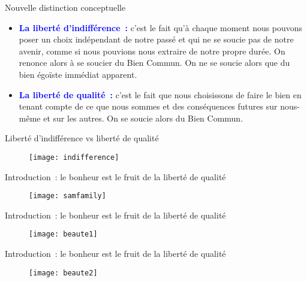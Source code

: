 \documentclass[11pt,xcolor=dvipsname,ignorenonframetext,handout]{beamer}
\begin{document}
\begin{frame}{Nouvelle distinction conceptuelle}
    \begin{itemize}
        \rightskip=0pt\leftskip=0pt
        \item \textcolor{blue}{\textbf{La liberté d'indifférence~:}} c'est le fait qu'à chaque moment nous pouvons poser un choix indépendant de notre passé et qui ne se soucie pas de notre avenir, comme si nous pouvions nous extraire de notre propre durée. On renonce alors à se soucier du Bien Commun. On ne se soucie alors que du bien égoïste immédiat apparent.
        \item \textcolor{blue}{\textbf{La liberté de qualité~:}} c'est le fait que nous choisissons de faire le bien en tenant compte de ce que nous sommes et des conséquences futures sur nous-même et sur les autres. On se soucie alors du Bien Commun.
    \end{itemize}
\end{frame}
\begin{frame}{Liberté d'indifférence vs liberté de qualité}
    {
        \begin{figure}
          \centering
          \texttt{[image: indifference]}
        \end{figure}
          }    
\end{frame}
\begin{frame}{Introduction~: le bonheur est le fruit de la liberté de qualité}
    {
        \begin{figure}
          \centering
          \texttt{[image: samfamily]}
        \end{figure}
          }    
\end{frame}
\begin{frame}{Introduction~: le bonheur est le fruit de la liberté de qualité}
    {
        \begin{figure}
          \centering
          \texttt{[image: beaute1]}
        \end{figure}
          }    
\end{frame}
\begin{frame}{Introduction~: le bonheur est le fruit de la liberté de qualité}
    {
        \begin{figure}
          \centering
          \texttt{[image: beaute2]}
        \end{figure}
          }    
\end{frame}
\end{document}
